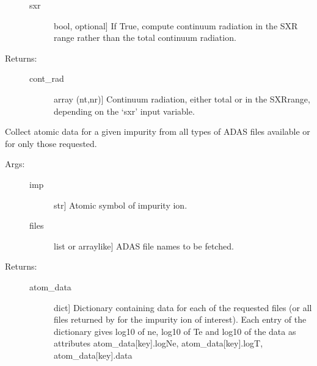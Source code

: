 \documentclass[letterpaper,10pt,english]{sphinxmanual}
\begin{document}
\begin{fulllineitems}
\begin{description}
\begin{description}
\item[{sxr}] \leavevmode{[}bool, optional{]}
If True, compute continuum radiation in the SXR range rather than the total 
continuum radiation.

\end{description}

\item[{Returns:}] \leavevmode\begin{description}
\item[{cont\_rad}] \leavevmode{[}array (nt,nr){]}
Continuum radiation, either total or in the SXR\sphinxhyphen{}range, depending on the 
‘sxr’ input variable.

\end{description}

\end{description}

\end{fulllineitems}


\begin{fulllineitems}
\label{\detokenize{aurora:aurora.atomic.get_atom_data}}
Collect atomic data for a given impurity from all types of ADAS files available or
for only those requested.
\begin{description}
\item[{Args:}] \leavevmode\begin{description}
\item[{imp}] \leavevmode{[}str{]}
Atomic symbol of impurity ion.

\item[{files}] \leavevmode{[}list or array\sphinxhyphen{}like{]}
ADAS file names to be fetched.

\end{description}

\item[{Returns:}] \leavevmode\begin{description}
\item[{atom\_data}] \leavevmode{[}dict{]}
Dictionary containing data for each of the requested files (or all files returned by
{\hyperref[\detokenize{aurora:aurora.atomic.adas_files_dict}]{}} for the impurity ion of interest). 
Each entry of the dictionary gives log\sphinxhyphen{}10 of ne, log\sphinxhyphen{}10 of Te and log\sphinxhyphen{}10 of the data
as attributes atom\_data{[}key{]}.logNe, atom\_data{[}key{]}.logT, atom\_data{[}key{]}.data

\end{description}

\end{description}

\end{fulllineitems}
\end{document}
